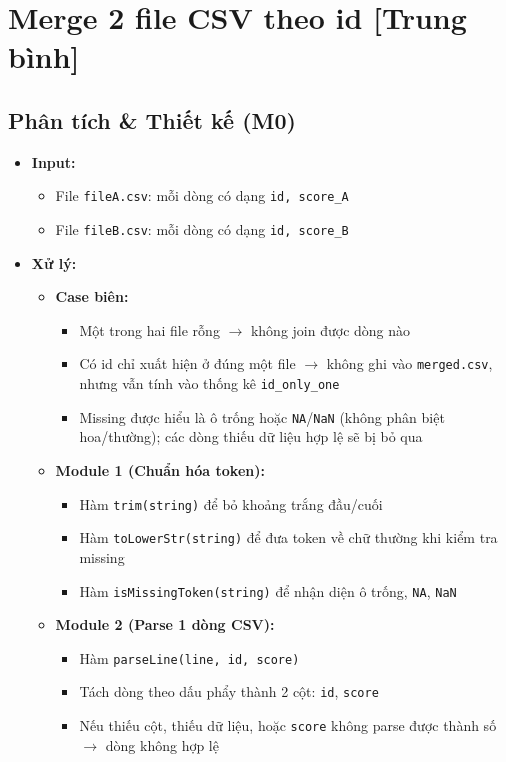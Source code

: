 \section{Merge 2 file CSV theo id [Trung bình]}

\subsection{Phân tích \& Thiết kế (M0)}
\begin{itemize}
    \item \textbf{Input:}
    \begin{itemize}
        \item File \texttt{fileA.csv}: mỗi dòng có dạng \texttt{id, score\_A}
        \item File \texttt{fileB.csv}: mỗi dòng có dạng \texttt{id, score\_B}
    \end{itemize}

    \item \textbf{Xử lý:}
    \begin{itemize}
        \item \textbf{Case biên:}
        \begin{itemize}
            \item Một trong hai file rỗng $\rightarrow$ không join được dòng nào
            \item Có id chỉ xuất hiện ở đúng một file $\rightarrow$ không ghi vào \texttt{merged.csv}, nhưng vẫn tính vào thống kê \texttt{id\_only\_one}
            \item Missing được hiểu là ô trống hoặc \texttt{NA}/\texttt{NaN} (không phân biệt hoa/thường); các dòng thiếu dữ liệu hợp lệ sẽ bị bỏ qua
        \end{itemize}

        \item \textbf{Module 1 (Chuẩn hóa token):}
        \begin{itemize}
            \item Hàm \texttt{trim(string)} để bỏ khoảng trắng đầu/cuối
            \item Hàm \texttt{toLowerStr(string)} để đưa token về chữ thường khi kiểm tra missing
            \item Hàm \texttt{isMissingToken(string)} để nhận diện ô trống, \texttt{NA}, \texttt{NaN}
        \end{itemize}

        \item \textbf{Module 2 (Parse 1 dòng CSV):}
        \begin{itemize}
            \item Hàm \texttt{parseLine(line, id, score)}
            \item Tách dòng theo dấu phẩy thành 2 cột: \texttt{id}, \texttt{score}
            \item Nếu thiếu cột, thiếu dữ liệu, hoặc \texttt{score} không parse được thành số $\rightarrow$ dòng không hợp lệ
        \end{itemize}


\end{itemize}
\end{itemize}
